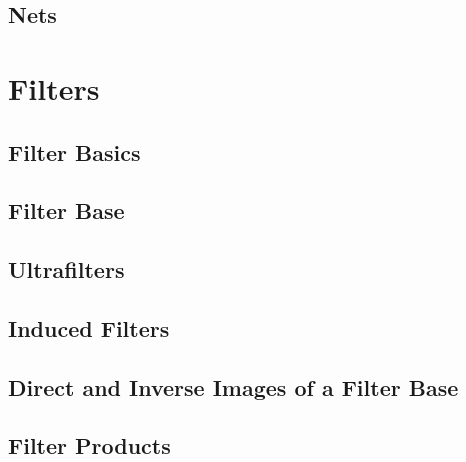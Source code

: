 \subsection{Nets}






\section{Filters}
\subsection{Filter Basics}





\subsection{Filter Base}






\subsection{Ultrafilters}


\subsection{Induced Filters}


\subsection{Direct and Inverse Images of a Filter Base}


\subsection{Filter Products}





